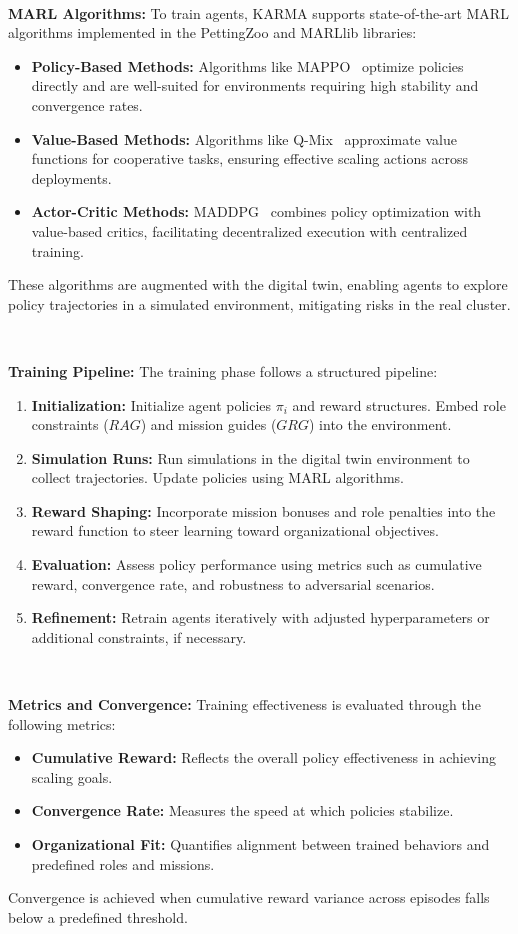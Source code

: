 \documentclass[conference]{IEEEtran}
\begin{document}
\

\noindent\textbf{MARL Algorithms:} 
To train agents, KARMA supports state-of-the-art MARL algorithms implemented in the PettingZoo and MARLlib libraries:
\begin{itemize}
    \item \textbf{Policy-Based Methods:} Algorithms like MAPPO~\cite{MAPPO2021} optimize policies directly and are well-suited for environments requiring high stability and convergence rates.
    \item \textbf{Value-Based Methods:} Algorithms like Q-Mix~\cite{QMIX2018} approximate value functions for cooperative tasks, ensuring effective scaling actions across deployments.
    \item \textbf{Actor-Critic Methods:} MADDPG~\cite{MADDPG2017} combines policy optimization with value-based critics, facilitating decentralized execution with centralized training.
\end{itemize}
These algorithms are augmented with the digital twin, enabling agents to explore policy trajectories in a simulated environment, mitigating risks in the real cluster.

\

\noindent\textbf{Training Pipeline:} 
The training phase follows a structured pipeline:
\begin{enumerate}
    \item \textbf{Initialization:} Initialize agent policies \( \pi_i \) and reward structures. Embed role constraints (\( RAG \)) and mission guides (\( GRG \)) into the environment.
    \item \textbf{Simulation Runs:} Run simulations in the digital twin environment to collect trajectories. Update policies using MARL algorithms.
    \item \textbf{Reward Shaping:} Incorporate mission bonuses and role penalties into the reward function to steer learning toward organizational objectives.
    \item \textbf{Evaluation:} Assess policy performance using metrics such as cumulative reward, convergence rate, and robustness to adversarial scenarios.
    \item \textbf{Refinement:} Retrain agents iteratively with adjusted hyperparameters or additional constraints, if necessary.
\end{enumerate}

\

\noindent\textbf{Metrics and Convergence:} 
Training effectiveness is evaluated through the following metrics:
\begin{itemize}
    \item \textbf{Cumulative Reward:} Reflects the overall policy effectiveness in achieving scaling goals.
    \item \textbf{Convergence Rate:} Measures the speed at which policies stabilize.
    \item \textbf{Organizational Fit:} Quantifies alignment between trained behaviors and predefined roles and missions.
\end{itemize}
Convergence is achieved when cumulative reward variance across episodes falls below a predefined threshold.
\end{document}
